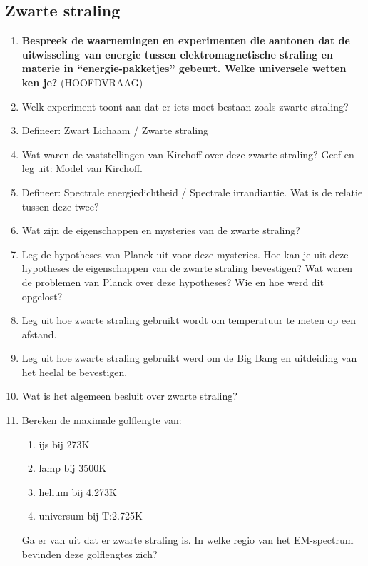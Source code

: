 \documentclass[12pt]{article}
\begin{document}
    \subsection{Zwarte straling}
    \begin{enumerate}
        \item \textbf{Bespreek de waarnemingen en experimenten die aantonen dat de uitwisseling van energie tussen elektromagnetische straling en materie in “energie-pakketjes” gebeurt. Welke universele wetten ken je?} (HOOFDVRAAG)
        \item Welk experiment toont aan dat er iets moet bestaan zoals zwarte straling?
        \item Defineer: Zwart Lichaam / Zwarte straling
        \item Wat waren de vaststellingen van Kirchoff over deze zwarte straling? Geef en leg uit: Model van Kirchoff.
        \item Defineer: Spectrale energiedichtheid / Spectrale irrandiantie. Wat is de relatie tussen deze twee?
        \item Wat zijn de eigenschappen en mysteries van de zwarte straling?
        \item Leg de hypotheses van Planck uit voor deze mysteries. Hoe kan je uit deze hypotheses de eigenschappen van de zwarte straling bevestigen? Wat waren de problemen van Planck over deze hypotheses? Wie en hoe werd dit opgelost?
        \item Leg uit hoe zwarte straling gebruikt wordt om temperatuur te meten op een afstand.
        \item Leg uit hoe zwarte straling gebruikt werd om de Big Bang en uitdeiding van het heelal te bevestigen.
        \item Wat is het algemeen besluit over zwarte straling?

        \item Bereken de maximale golflengte van:
            \begin{enumerate}
                \item ijs bij 273K
                \item lamp bij 3500K
                \item helium bij 4.273K
                \item universum bij T:2.725K
            \end{enumerate}
            Ga er van uit dat er zwarte straling is. In welke regio van het EM-spectrum bevinden deze golflengtes zich?
    \end{enumerate}
\end{document}
